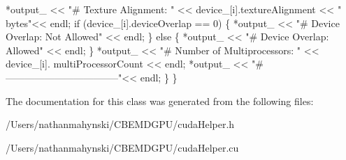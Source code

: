 \begin{DoxyCode}
        *output\_ << \textcolor{stringliteral}{"# Texture Alignment: "} << device\_[i].textureAlignment << \textcolor{stringliteral}{"
       bytes"}<< endl;
        \textcolor{keywordflow}{if} (device\_[i].deviceOverlap == 0) \{
            *output\_ << \textcolor{stringliteral}{"# Device Overlap: Not Allowed"} << endl;
        \} \textcolor{keywordflow}{else} \{
            *output\_ << \textcolor{stringliteral}{"# Device Overlap: Allowed"} << endl;
        \}
        *output\_ << \textcolor{stringliteral}{"# Number of Multiprocessors: "} << device\_[i].
      multiProcessorCount << endl;
        *output\_ << \textcolor{stringliteral}{"# -----------------------------------"}<< endl;
    \}
\}
\end{DoxyCode}


The documentation for this class was generated from the following files\-:\begin{DoxyCompactItemize}
\item 
/\-Users/nathanmahynski/\-C\-B\-E\-M\-D\-G\-P\-U/cuda\-Helper.\-h\item 
/\-Users/nathanmahynski/\-C\-B\-E\-M\-D\-G\-P\-U/cuda\-Helper.\-cu\end{DoxyCompactItemize}
